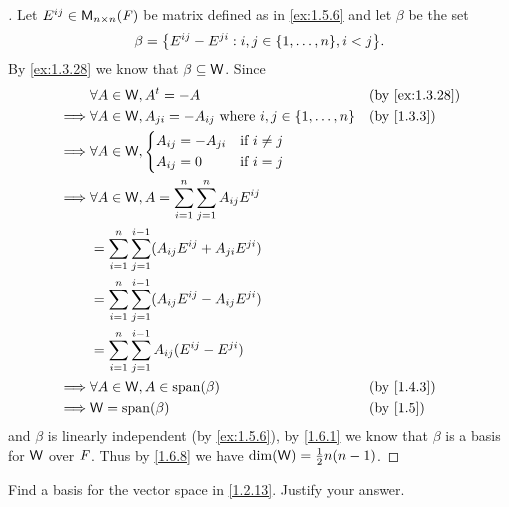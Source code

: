 \begin{proof}[]
	Let \(E^{i j} \in \ms[n][n][\F]\) be matrix defined as in \cref{ex:1.5.6} and let \(\beta\) be the set
	\[
		\beta = \set{E^{i j} - E^{j i} : i, j \in \set{1, \dots, n}, i < j}.
	\]
	By \cref{ex:1.3.28} we know that \(\beta \subseteq \mathsf{W}\).
	Since
	\begin{align*}
		         & \forall A \in \W, \tp{A} = -A                                                  &  & \by{ex:1.3.28} \\
		\implies & \forall A \in \W, A_{j i} = -A_{i j} \text{ where } i, j \in \set{1, \dots, n} &  & \by{1.3.3}     \\
		\implies & \forall A \in \W, \begin{dcases}
			                             A_{i j} = -A_{j i} & \text{if } i \neq j \\
			                             A_{i j} = 0        & \text{if } i = j
		                             \end{dcases}                                         \\
		\implies & \forall A \in \W, A = \sum_{i = 1}^n \sum_{j = 1}^n A_{i j} E^{i j}                                \\
		         & = \sum_{i = 1}^n \sum_{j = 1}^{i - 1} (A_{i j} E^{i j} + A_{j i} E^{j i})                          \\
		         & = \sum_{i = 1}^n \sum_{j = 1}^{i - 1} (A_{i j} E^{i j} - A_{i j} E^{j i})                          \\
		         & = \sum_{i = 1}^n \sum_{j = 1}^{i - 1} A_{i j} (E^{i j} - E^{j i})                                  \\
		\implies & \forall A \in \W, A \in \spn{\beta}                                            &  & \by{1.4.3}     \\
		\implies & \W = \spn{\beta}                                                               &  & \by{1.5}
	\end{align*}
	and \(\beta\) is linearly independent (by \cref{ex:1.5.6}), by \cref{1.6.1} we know that \(\beta\) is a basis for \(\mathsf{W}\) over \(\mathit{F}\).
	Thus by \cref{1.6.8} we have \(\dim(\mathsf{W}) = \frac{1}{2} n(n - 1)\).
\end{proof}

\begin{ex}\label{ex:1.6.18}
	Find a basis for the vector space in \cref{1.2.13}.
	Justify your answer.
\end{ex}

